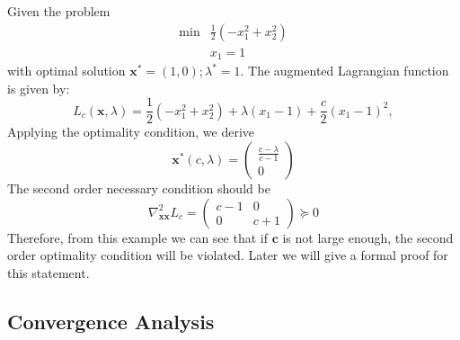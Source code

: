 \begin{example}
Given the problem
\[
\begin{array}{ll}
\min&\frac{1}{2}(-x_1^2+x_2^2)\\
&x_1=1
\end{array}
\]
with optimal solution $\bm x^*=(1,0);\lambda^*=1$. The augmented Lagrangian function is given by:
\[
L_c(\bm x,\lambda)=\frac{1}{2}(-x_1^2+x_2^2)+\lambda(x_1-1)+\frac{c}{2}(x_1-1)^2,
\]
Applying the optimality condition, we derive
\[
\bm x^*(c,\lambda)=\begin{pmatrix}
\frac{c-\lambda}{c-1}\\0
\end{pmatrix}
\]
The second order necessary condition should be
\[
\nabla_{\bm{xx}}^2L_c=\begin{pmatrix}
c-1&0\\0&c+1
\end{pmatrix}\succeq0
\]
Therefore, from this example we can see that if $\bm c$ is not large enough, the second order optimality condition will be violated. Later we will give a formal proof for this statement.
\end{example}

\subsection{Convergence Analysis}

